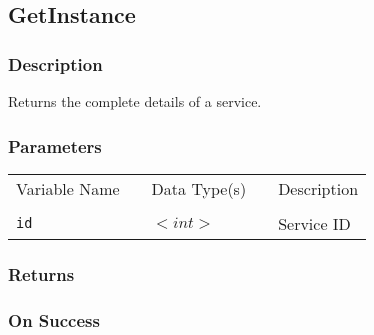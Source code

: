 \subsection{GetInstance}

\subsubsection{Description}

Returns the complete details of a service.

\subsubsection{Parameters}

\begin{tabular}{lllll}
Variable Name	&		&	Data Type(s)		&	&	Description	\\
				&	&	&	&	\\
\verb!id! & \hspace{15mm} & $<int>$ & \hspace{15mm} & Service ID \\
\end{tabular}

\subsubsection{Returns}

\subsubsection{On Success}

